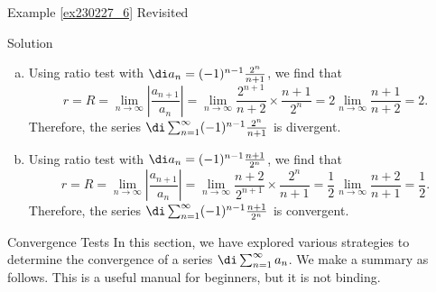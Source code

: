 \begin{example}{\linkt Example \ref{ex230227_6} Revisited}
\begin{example}[label=ex230227_13]{}
\begin{example}
\begin{enumerate}[(a)]
\end{enumerate}
\end{example}
\begin{solution}{Solution}
\begin{enumerate}[(a)]
\item Using  ratio test with $\di a_n=(-1)^{n-1}\frac{2^n}{n+1}$, we find that
\[r=R=\lim_{n\to\infty}\left|\frac{a_{n+1}}{a_n}\right|=\lim_{n\to\infty}\frac{2^{n+1}}{n+2}\times\frac{n+1}{2^n}=2\lim_{n\to\infty}\frac{n+1}{n+2}=2.\]
Therefore, the series $\di \sum_{n=1}^{\infty}(-1)^{n-1}\frac{2^n}{n+1}$ is divergent.
\item Using  ratio test with $\di a_n=(-1)^{n-1}\frac{n+1}{2^n}$, we find that
\[r=R=\lim_{n\to\infty}\left|\frac{a_{n+1}}{a_n}\right|=\lim_{n\to\infty}\frac{n+2}{2^{n+1}}\times\frac{2^n}{n+1}=\frac{1}{2}\lim_{n\to\infty}\frac{n+2}{n+1}=\frac{1}{2}.\]
Therefore, the series $\di \sum_{n=1}^{\infty}(-1)^{n-1}\frac{n+1}{2^n}$ is convergent.

\end{enumerate}
\end{solution}

\begin{highlight}{Convergence Tests}
In this section, we have explored various strategies to determine the convergence of a series $\di\sum_{n=1}^{\infty}a_n$. We make a summary as follows. This is a useful manual for beginners, but it is not binding.


\end{highlight}
\end{example}
\end{example}
